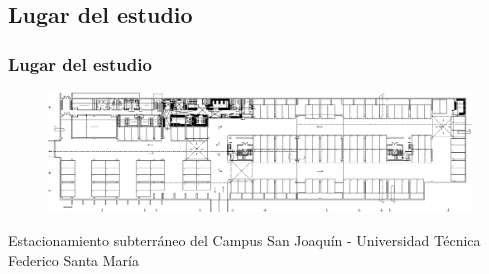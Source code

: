 \documentclass[mathserif]{beamer}
\begin{document}
\subsection{Lugar del estudio}

\begin{frame}
\frametitle{Lugar del estudio}

\begin{figure}
\includegraphics[width=\textwidth]{../figures_chesta/diseno_del_exp/plano_est}
\end{figure}

Estacionamiento subterráneo del Campus San Joaquín - Universidad Técnica Federico Santa María

\end{frame}

\end{document}
